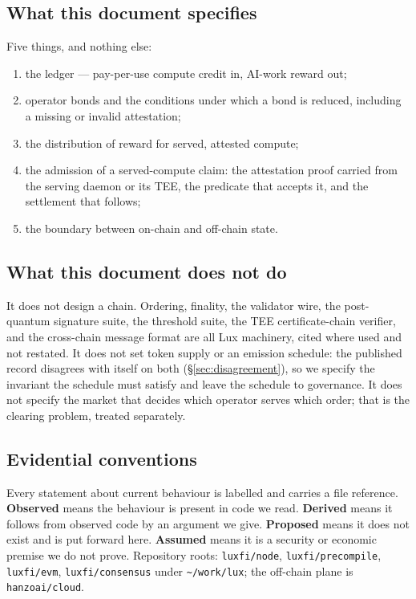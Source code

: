 \documentclass[11pt,a4paper]{article}
\theoremstyle{definition}
\theoremstyle{remark}
\newcommand{\code}[1]{\texttt{#1}}
\begin{document}
\subsection{What this document specifies}

Five things, and nothing else:

\begin{enumerate}[label=(\arabic*),leftmargin=2.2em]
\item the ledger --- pay-per-use compute credit in, AI-work reward out;
\item operator bonds and the conditions under which a bond is reduced,
      including a missing or invalid attestation;
\item the distribution of reward for served, attested compute;
\item the admission of a served-compute claim: the attestation proof carried
      from the serving daemon or its TEE, the predicate that accepts it, and
      the settlement that follows;
\item the boundary between on-chain and off-chain state.
\end{enumerate}

\subsection{What this document does not do}

It does not design a chain. Ordering, finality, the validator wire, the
post-quantum signature suite, the threshold suite, the TEE certificate-chain
verifier, and the cross-chain message format are all Lux machinery, cited where
used and not restated. It does not set token supply or an emission schedule: the
published record disagrees with itself on both (\S\ref{sec:disagreement}), so we
specify the invariant the schedule must satisfy and leave the schedule to
governance. It does not specify the market that decides which operator serves
which order; that is the clearing problem, treated separately.

\subsection{Evidential conventions}

Every statement about current behaviour is labelled and carries a file
reference. \textbf{Observed} means the behaviour is present in code we read.
\textbf{Derived} means it follows from observed code by an argument we give.
\textbf{Proposed} means it does not exist and is put forward here.
\textbf{Assumed} means it is a security or economic premise we do not prove.
Repository roots: \code{luxfi/node}, \code{luxfi/precompile}, \code{luxfi/evm},
\code{luxfi/consensus} under \code{\textasciitilde/work/lux}; the off-chain
plane is \code{hanzoai/cloud}.
\end{document}

